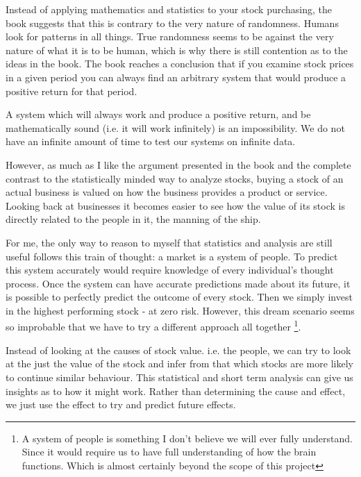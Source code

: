 \documentclass[11pt]{article}
\begin{document}
    Instead of applying mathematics and statistics to your stock purchasing, the book
    suggests that this is contrary to the 
    very nature of randomness. Humans look for patterns in all things. True 
    randomness seems to be against the very nature of what it is to be human, which is why
    there is still contention as to the ideas in the book. The book reaches a conclusion that
    if you examine stock prices in a given period you can always find an arbitrary
    system that would produce a positive return for that period.

    A system which will always work and produce a positive return, and be mathematically sound
    (i.e. it will work infinitely) is an impossibility. We do not have an infinite amount of
    time to test our systems on infinite data.

    However, as much as I like the argument presented in the book and the complete contrast to
    the statistically minded way to analyze stocks, buying a stock of an
    actual business is valued on how the business provides a product or service.
    Looking back at businesses it becomes easier to see how the value of its stock is directly
    related to the people in it, the manning of the ship.

    For me, the only way to reason to myself that statistics and analysis are still 
    useful follows this train of thought: a market is a system of people.
    To predict this system accurately would require knowledge of every individual's
    thought process. Once the system can have accurate predictions made about its
    future, it is possible to perfectly predict the outcome of every stock. Then
    we simply invest in the highest performing stock - at zero risk. However, this
    dream scenario seems so improbable that we have to try a different approach
    all together
    \footnote{A system of people is something I don't believe we will ever fully understand.
    Since it would require us to have full understanding of how the brain functions. Which
    is almost certainly beyond the scope of this project}.

    Instead of looking at the causes of stock value. i.e. the people, we can try to look
    at the just the value of the stock and infer from that which stocks are more
    likely to continue similar behaviour. This 
    statistical and short term analysis can give us insights as to 
    how it might work. Rather than determining the cause and effect, we just use the effect
    to try and predict future effects.
\end{document}
